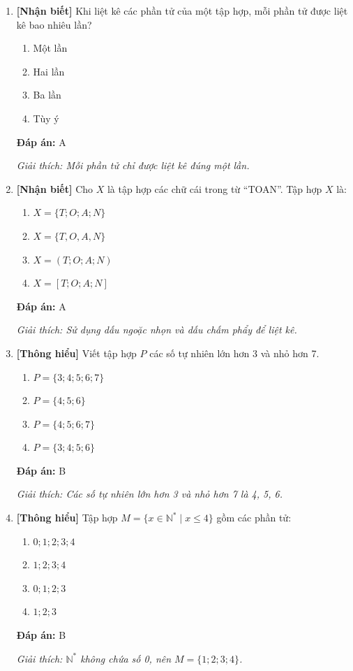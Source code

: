 \documentclass[12pt,a4paper]{article}
\newcommand{\nhanbiet}{\textcolor{nhanbiet}{\textbf{[Nhận biết]}}}
\newcommand{\thonghieu}{\textcolor{thonghieu}{\textbf{[Thông hiểu]}}}
\newcommand{\dapan}[1]{\par\smallskip\textbf{Đáp án:} #1}
\newcommand{\giaithich}[1]{\par\textit{Giải thích: #1}}
\begin{document}
\begin{enumerate}[label=\textbf{Câu \arabic*.}]
    \item \nhanbiet{} Khi liệt kê các phần tử của một tập hợp, mỗi phần tử được liệt kê bao nhiêu lần?
    \begin{enumerate}[label=\Alph*.]
        \item Một lần
        \item Hai lần
        \item Ba lần
        \item Tùy ý
    \end{enumerate}
    \dapan{A}
    \giaithich{Mỗi phần tử chỉ được liệt kê đúng một lần.}

    \item \nhanbiet{} Cho $X$ là tập hợp các chữ cái trong từ ``TOAN''. Tập hợp $X$ là:
    \begin{enumerate}[label=\Alph*.]
        \item $X = \{T; O; A; N\}$
        \item $X = \{T, O, A, N\}$
        \item $X = (T; O; A; N)$
        \item $X = [T; O; A; N]$
    \end{enumerate}
    \dapan{A}
    \giaithich{Sử dụng dấu ngoặc nhọn và dấu chấm phẩy để liệt kê.}

    \item \thonghieu{} Viết tập hợp $P$ các số tự nhiên lớn hơn 3 và nhỏ hơn 7.
    \begin{enumerate}[label=\Alph*.]
        \item $P = \{3; 4; 5; 6; 7\}$
        \item $P = \{4; 5; 6\}$
        \item $P = \{4; 5; 6; 7\}$
        \item $P = \{3; 4; 5; 6\}$
    \end{enumerate}
    \dapan{B}
    \giaithich{Các số tự nhiên lớn hơn 3 và nhỏ hơn 7 là 4, 5, 6.}

    \item \thonghieu{} Tập hợp $M = \{x \in \mathbb{N}^* \mid x \le 4\}$ gồm các phần tử:
    \begin{enumerate}[label=\Alph*.]
        \item $0; 1; 2; 3; 4$
        \item $1; 2; 3; 4$
        \item $0; 1; 2; 3$
        \item $1; 2; 3$
    \end{enumerate}
    \dapan{B}
    \giaithich{$\mathbb{N}^*$ không chứa số 0, nên $M = \{1; 2; 3; 4\}$.}


\end{enumerate}
\end{document}
